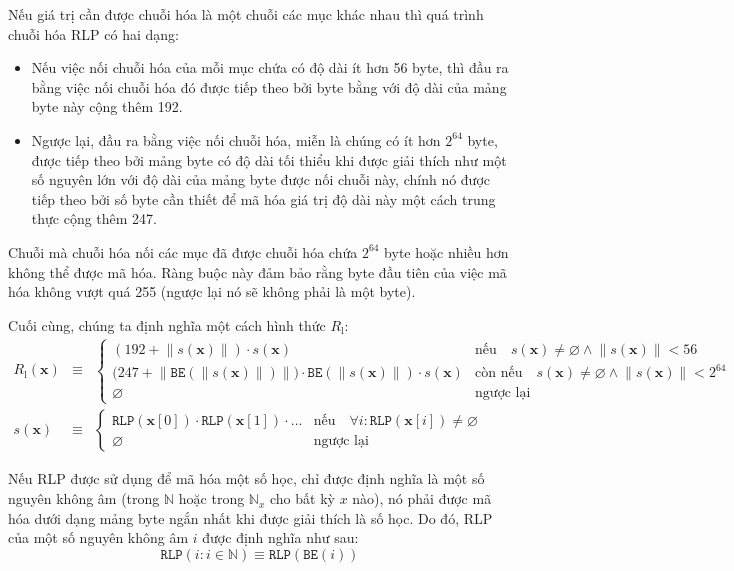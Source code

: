 \documentclass[9pt,oneside]{amsart}
\makeatletter
\newcommand{\linkdest}[1]{\Hy@raisedlink{\hypertarget{#1}{}}}
\makeatother
\begin{document}
\hypertarget{RLP_serialisation_of_a_sequence_of_other_items_R__l_word_def}{}\linkdest{R__l}Nếu giá trị cần được chuỗi hóa là một chuỗi các mục khác nhau thì quá trình chuỗi hóa RLP có hai dạng:

\begin{itemize}
\item Nếu việc nối chuỗi hóa của mỗi mục chứa có độ dài ít hơn 56 byte, thì đầu ra bằng việc nối chuỗi hóa đó được tiếp theo bởi byte bằng với độ dài của mảng byte này cộng thêm 192.
\item Ngược lại, đầu ra bằng việc nối chuỗi hóa, miễn là chúng có ít hơn $2^{64}$ byte, được tiếp theo bởi mảng byte có độ dài tối thiểu khi được giải thích như một số nguyên lớn với độ dài của mảng byte được nối chuỗi này, chính nó được tiếp theo bởi số byte cần thiết để mã hóa giá trị độ dài này một cách trung thực cộng thêm 247.
\end{itemize}

Chuỗi mà chuỗi hóa nối các mục đã được chuỗi hóa chứa $2^{64}$ byte hoặc nhiều hơn không thể được mã hóa. Ràng buộc này đảm bảo rằng byte đầu tiên của việc mã hóa không vượt quá 255 (ngược lại nó sẽ không phải là một byte).

\hypertarget{RLP_serialisation_of_a_sequence_of_other_items_R__l_math_def}{}Cuối cùng, chúng ta định nghĩa một cách hình thức $R_{\mathrm{l}}$:
\begin{eqnarray}
R_{\mathrm{l}}(\mathbf{x}) & \equiv & \begin{cases}
(192 + \lVert s(\mathbf{x}) \rVert) \cdot s(\mathbf{x}) & \text{nếu} \quad s(\mathbf{x}) \neq \varnothing \wedge \lVert s(\mathbf{x}) \rVert < 56 \\
\big(247 + \big\lVert \mathtt{BE}(\lVert s(\mathbf{x}) \rVert) \big\rVert \big) \cdot \mathtt{BE}(\lVert s(\mathbf{x}) \rVert) \cdot s(\mathbf{x}) & \text{còn nếu} \quad s(\mathbf{x}) \neq \varnothing \wedge \lVert s(\mathbf{x}) \rVert < 2^{64} \\
\varnothing & \text{ngược lại}
\end{cases} \\
s(\mathbf{x}) & \equiv & \begin{cases}
\mathtt{RLP}(\mathbf{x}[0]) \cdot \mathtt{RLP}(\mathbf{x}[1]) \cdot ... & \text{nếu} \quad \forall i: \mathtt{RLP}(\mathbf{x}[i]) \neq \varnothing \\
\varnothing & \text{ngược lại}
\end{cases}
\end{eqnarray}

Nếu RLP được sử dụng để mã hóa một số học, chỉ được định nghĩa là một số nguyên không âm (trong $\mathbb{N}$ hoặc trong $\mathbb{N}_x$ cho bất kỳ $x$ nào), nó phải được mã hóa dưới dạng mảng byte ngắn nhất khi được giải thích là số học. Do đó, RLP của một số nguyên không âm $i$ được định nghĩa như sau:
\begin{equation}
\mathtt{RLP}(i : i \in \mathbb{N}) \equiv \mathtt{RLP}(\mathtt{BE}(i))
\end{equation}
\end{document}
